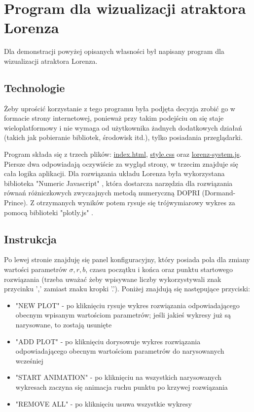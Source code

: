 \documentclass[12pt]{report}
\begin{document}
\chapter{Program dla wizualizacji atraktora Lorenza}
	\par Dla demonstracji powyżej opisanych własności był napisany program dla wizualizacji atraktora Lorenza.
	
	\section{Technologie}
	\par Żeby uprościć korzystanie z tego programu była podjęta decyzja zrobić go w formacie strony internetowej, ponieważ przy takim podejściu on się staje wieloplatformowy i nie wymaga od użytkownika żadnych dodatkowych działań (takich jak pobieranie bibliotek, środowisk itd.), tylko posiadania przeglądarki.
	
	\par Program składa się z trzech plików: \hyperref[sec:html]{index.html}, \hyperref[sec:css]{style.css} oraz \hyperref[sec:js]{lorenz-system.js}. Piersze dwa odpowiadają oczywiście za wygląd strony, w trzecim znajduje się cała logika aplikacji. Dla rozwiązania układu Lorenza była wykorzystana biblioteka "Numeric Javascript" \cite{NumJS}, która dostarcza narzędzia dla rozwiązania równań różniczkowych zwyczajnych metodą numeryczną DOPRI (Dormand-Prince). Z otrzymanych wyników potem rysuje się trójwymiarowy wykres za pomocą biblioteki "plotly.js" \cite{Ply}.
	
	\section{Instrukcja}
	\par Po lewej stronie znajduję się panel konfiguracyjny, który posiada pola dla zmiany wartości parametrów $\sigma, r, b$, czasu początku i końca oraz punktu startowego rozwiązania (trzeba uważać żeby wpisywane liczby wykorzystywali znak przycinku ',' zamiast znaku kropki '.'). Poniżej znajdują się następujące przyciski:
	\begin{itemize}
		\item "NEW PLOT" - po kliknięciu rysuje wykres rozwiązania odpowiadającego obecnym wpisanym wartościom parametrów; jeśli jakieś wykresy już są narysowane, to zostają usunięte
		\item "ADD PLOT" - po kliknięciu dorysowuje wykres rozwiązania odpowiadającego obecnym wartościom parametrów do narysowanych wcześniej
		\item "START ANIMATION" - po kliknięciu na wszystkich narysowanych wykresach zaczyna się animacja ruchu punktu po krzywej rozwiązania
		\item "REMOVE ALL" - po kliknięciu usuwa wszystkie wykresy
	\end{itemize}
\end{document}

